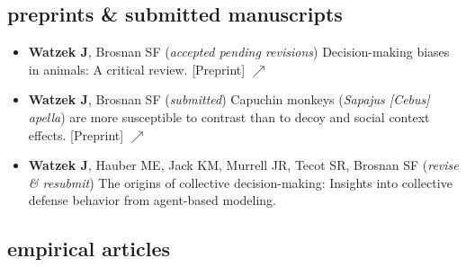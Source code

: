 \documentclass[]{friggeri-cv}
\begin{document}

\subsection{preprints \& submitted manuscripts}

\begin{itemize}[align=center]
  \item {\textbf{Watzek J}, Brosnan SF (\emph{accepted pending revisions}) Decision-making biases in animals: A critical review. [Preprint] \href{https://doi.org/10.31219/osf.io/4gu2f}{\small $\nearrow$}} 
  \item {\textbf{Watzek J}, Brosnan SF (\emph{submitted}) Capuchin monkeys (\emph{Sapajus [Cebus] apella}) are more susceptible to contrast than to decoy and social context effects. [Preprint] \href{https://doi.org/10.31219/osf.io/3s4km}{\small $\nearrow$}} 
  \item \textbf{Watzek J}, Hauber ME, Jack KM, Murrell JR, Tecot SR, Brosnan SF (\emph{revise \& resubmit}) The origins of collective decision-making: Insights into collective defense behavior from agent-based modeling.

\end{itemize}


\subsection{empirical articles}
\end{document}

